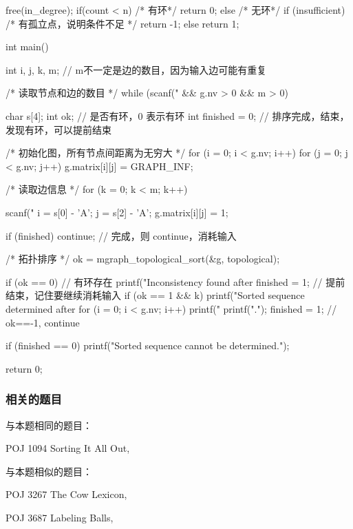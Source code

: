 \begin{Codex}[label=poj_1094.c]
{    free(in_degree);
    if(count < n) { /* 有环*/
        return 0;
    } else { /* 无环*/
        if (insufficient) {  /* 有孤立点，说明条件不足 */
            return -1;
        } else {
            return 1;
        }
    }
}

int main() {
    int i, j, k, m;  // m不一定是边的数目，因为输入边可能有重复

    /* 读取节点和边的数目 */
    while (scanf("%
            && g.nv > 0 && m > 0) {
        char s[4];
        int ok;  // 是否有环，0 表示有环
        int finished = 0;  // 排序完成，结束，发现有环，可以提前结束

        /* 初始化图，所有节点间距离为无穷大 */
        for (i = 0; i < g.nv; i++) {
            for (j = 0; j < g.nv; j++) {
                g.matrix[i][j] = GRAPH_INF;
            }
        }

        /* 读取边信息 */
        for (k = 0; k < m; k++) {
            scanf("%
            i = s[0] - 'A';
            j = s[2] - 'A';
            g.matrix[i][j] = 1;

            if (finished) continue;    // 完成，则 continue，消耗输入

            /* 拓扑排序 */
            ok = mgraph_topological_sort(&g, topological);

            if (ok == 0) {  // 有环存在
                printf("Inconsistency found after %
                finished = 1;  // 提前结束，记住要继续消耗输入
            }
            if (ok == 1 && k) {
                printf("Sorted sequence determined after %
                for (i = 0; i < g.nv; i++) {
                    printf("%
                }
                printf(".\n");
                finished = 1;
            }
            // ok==-1, continue
        }
        if (finished == 0) {
            printf("Sorted sequence cannot be determined.\n");
        }
    }
    return 0;
}
\end{Codex}

\subsubsection{相关的题目}
与本题相同的题目：
\begindot
\item POJ 1094 Sorting It All Out, 
\myenddot

与本题相似的题目：
\begindot
\item POJ 3267 The Cow Lexicon, 
\item POJ 3687 Labeling Balls, 
\myenddot


